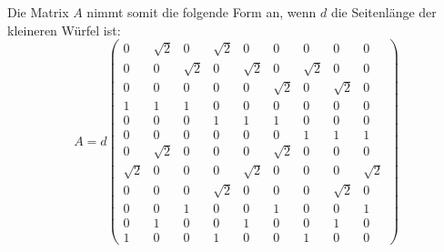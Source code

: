 \noindent
Die Matrix $A$ nimmt somit die folgende Form an, wenn $d$ die Seitenlänge der kleineren Würfel ist:
\begin{equation}
    A = d \begin{pmatrix} 
        0       & \sqrt{2} & 0      & \sqrt{2}  & 0         & 0         & 0         & 0         & 0         \\
        0       & 0        &\sqrt{2}& 0         &\sqrt{2}   & 0         &\sqrt{2}   & 0         & 0         \\
        0       & 0        & 0      & 0         & 0         &\sqrt{2}   & 0         & \sqrt{2}  & 0         \\
        1       & 1        & 1      & 0         & 0         & 0         & 0         & 0         & 0         \\
        0       & 0        & 0      & 1         & 1         & 1         & 0         & 0         & 0         \\
        0       & 0        & 0      & 0         & 0         & 0         & 1         & 1         & 1         \\
        0       & \sqrt{2} & 0      & 0         & 0         & \sqrt{2}  & 0         & 0         & 0         \\
        \sqrt{2}& 0        & 0      & 0         & \sqrt{2}  & 0         & 0         & 0         & \sqrt{2}  \\
        0       & 0        & 0      & \sqrt{2}  & 0         & 0         & 0         & \sqrt{2}  & 0         \\
        0       & 0        & 1      & 0         & 0         & 1         & 0         & 0         & 1         \\
        0       & 1        & 0      & 0         & 1         & 0         & 0         & 1         & 0         \\
        1       & 0        & 0      & 1         & 0         & 0         & 1         & 0         & 0         
    \end{pmatrix}
    \label{eqn:A}
\end{equation}

